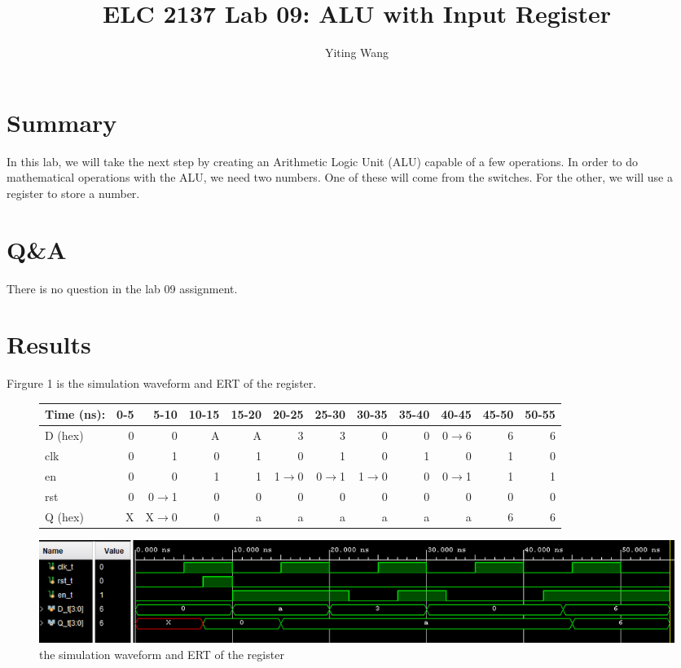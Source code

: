 \documentclass[11pt]{article}
\begin{document}
\title{ELC 2137 Lab 09: ALU with Input Register}
\author{Yiting Wang}

\maketitle


\section*{Summary}

In this lab, we will take the next step by creating an Arithmetic Logic Unit (ALU) capable of a few operations. In order to do mathematical operations with the ALU, we need two numbers. One of these will come from the switches. For the other, we will use a register to store a number.


\section*{Q\&A}

There is no question in the lab 09 assignment.


\section*{Results}


Firgure 1 is the simulation waveform and ERT of the register.\\
\begin{figure}[ht]\centering
	\begin{tabular}{l|rrrrrrrrrrr}
		Time (ns): & 0-5 & 5-10 & 10-15 & 15-20 & 20-25 & 25-30 & 30-35 & 35-40 & 40-45 & 45-50 & 50-55 \\
		\midrule
		D (hex) & 0 & 0 	  & A & A & 3 	    & 3 	  & 0 	    & 0 & 0$\to$6 & 6 & 6 \\
		clk     & 0 & 1 	  & 0 & 1 & 0 	    & 1 	  & 0 	    & 1 & 0 	  & 1 & 0 \\
		en  	& 0 & 0 	  & 1 & 1 & 1$\to$0 & 0$\to$1 & 1$\to$0 & 0 & 0$\to$1 & 1 & 1 \\
		rst 	& 0 & 0$\to$1 & 0 & 0 & 0 		& 0 	  & 0		& 0 & 0		  & 0 & 0 \\
		\midrule
		Q (hex) & X & X$\to$0 & 0 & a & a & a & a & a & a & 6 & 6 \\
		\bottomrule
	\end{tabular}\medskip
	
	\includegraphics[width=1\textwidth]{register_simulation}
	\caption{the simulation waveform and ERT of the register}
	\label{fig:register_simulation}
\end{figure}
\end{document}
